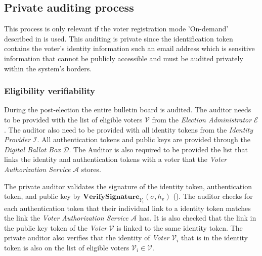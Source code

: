 \subsection{Private auditing process} \label{sec: private auditing process}
This process is only relevant if the voter registration mode 'On-demand' described in  is used. This auditing is private since the identification token contains the voter's identity information such an email address which is sensitive information that cannot be publicly accessible and must be audited privately within the system's borders.


\subsubsection{Eligibility verifiability}
During the post-election the entire bulletin board is audited. The auditor needs to be provided with the list of eligible voters $\boldsymbol{\mathcal{V}}$ from the \textit{Election Administrator} $\mathcal{E}$. The auditor also need to be provided with all identity tokens from the \textit{Identity Provider} $\mathcal{I}$. All authentication tokens and public keys are provided through the \textit{Digital Ballot Box} $\mathcal{D}$. The Auditor is also required to be provided the list that links the identity and authentication tokens with a voter that the \textit{Voter Authorization Service} $\mathcal{A}$ stores. 

The private auditor validates the signature of the identity token, authentication token, and public key by \( \mathbf{VerifySignature}_{Y_i} (\sigma, h_\mathrm{v}) \) (). The auditor checks for each authentication token that their individual link to a identity token matches the link the \textit{Voter Authorization Service} $\mathcal{A}$ has. It is also checked that the link in the public key token of the \textit{Voter} $\mathcal{V}$ is linked to the same identity token. The private auditor also verifies that the identity of \textit{Voter} $\mathcal{V}_i$ that is in the identity token is also on the list of eligible voters $\mathcal{V}_i \in \boldsymbol{\mathcal{V}}$. 
